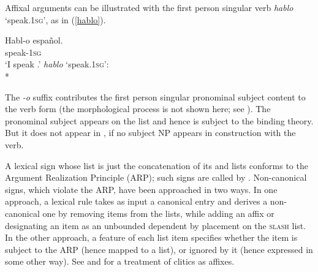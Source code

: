 \documentclass[output=paper
 	        ,biblatex
                ,babelshorthands
                ,newtxmath
                ,draftmode
                ,colorlinks, citecolor=brown
]{langscibook}
\begin{document}
Affixal arguments can be illustrated with the first person singular  verb \textit{hablo} `speak.\textsc{1sg}', as in (\ref{hablo}).


\begin{exe} 
\ex	\label{hablo}
\begin{xlist}
\ex 		\gll Habl-o espa\~{n}ol.  \\
		speak-\textsc{1sg}   \\
		\glt `I speak .'
\ex \textit{hablo} `speak.\textsc{1sg}': \\*
\end{xlist}
\end{exe}

\noindent
The \textit{-o} suffix contributes the first person singular pronominal subject content to the verb
form (the morphological process is not shown here; see ).  The
pronominal subject appears on the \argst list and hence is subject to the binding theory.  But it
does not appear in \subj, if no subject NP appears in construction with the verb.

A lexical sign whose \argst list is just the concatenation of its \subj and \comps lists conforms to
the Argument Realization Principle (ARP); such signs are called
 by \citet{Boumaetal2001}.  Non-canonical signs, which
violate the ARP, have been approached in two ways.  In one approach, a lexical rule takes as input a
canonical entry and derives a non-canonical one by removing items from the  lists, while adding
an affix or designating an item as an unbounded dependent by placement on the \textsc{slash}
list. In the other
approach, a feature of each \argst list item specifies whether the item is subject to the ARP (hence mapped to
a  list), or ignored by it (hence expressed in some other way).  See  and \citet{MillerandSag1997} for a treatment of  clitics as affixes.
\end{document}
